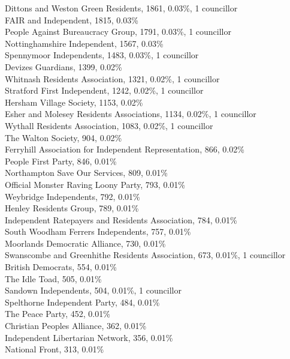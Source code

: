 \documentclass[a4paper,openany,10pt]{book}
\begin{document}
Dittons and Weston Green Residents, 1861, 0.03\%, 1 councillor\\
FAIR and Independent, 1815, 0.03\% \\
People Against Bureaucracy Group, 1791, 0.03\%, 1 councillor\\
Nottinghamshire Independent, 1567, 0.03\% \\
Spennymoor Independents, 1483, 0.03\%, 1 councillor\\
Devizes Guardians, 1399, 0.02\% \\
Whitnash Residents Association, 1321, 0.02\%, 1 councillor\\
Stratford First Independent, 1242, 0.02\%, 1 councillor\\
Hersham Village Society, 1153, 0.02\% \\
Esher and Molesey Residents Associations, 1134, 0.02\%, 1 councillor\\
Wythall Residents Association, 1083, 0.02\%, 1 councillor\\
The Walton Society, 904, 0.02\% \\
Ferryhill Association for Independent Representation, 866, 0.02\% \\
People First Party, 846, 0.01\% \\
Northampton Save Our Services, 809, 0.01\% \\
Official Monster Raving Loony Party, 793, 0.01\% \\
Weybridge Independents, 792, 0.01\% \\
Henley Residents Group, 789, 0.01\% \\
Independent Ratepayers and Residents Association, 784, 0.01\% \\
South Woodham Ferrers Independents, 757, 0.01\% \\
Moorlands Democratic Alliance, 730, 0.01\% \\
Swanscombe and Greenhithe Residents Association, 673, 0.01\%, 1 councillor\\
British Democrats, 554, 0.01\% \\
The Idle Toad, 505, 0.01\% \\
Sandown Independents, 504, 0.01\%, 1 councillor\\
Spelthorne Independent Party, 484, 0.01\% \\
The Peace Party, 452, 0.01\% \\
Christian Peoples Alliance, 362, 0.01\% \\
Independent Libertarian Network, 356, 0.01\% \\
National Front, 313, 0.01\% \\
\end{document}
